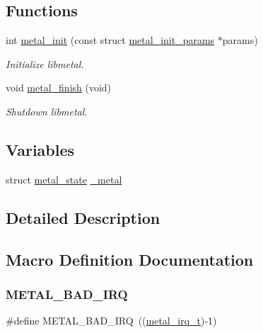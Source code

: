 \subsection*{Functions}
\begin{DoxyCompactItemize}
\item 
int \hyperlink{group__system_ga9a5f477e8ab7ed4bcc57e6d01a4ad3c7}{metal\+\_\+init} (const struct \hyperlink{structmetal__init__params}{metal\+\_\+init\+\_\+params} $\ast$params)
\begin{DoxyCompactList}\small\item\em Initialize libmetal. \end{DoxyCompactList}\item 
void \hyperlink{group__system_ga5760e3af70ec9a782c53e8ad9193d66b}{metal\+\_\+finish} (void)
\begin{DoxyCompactList}\small\item\em Shutdown libmetal. \end{DoxyCompactList}\end{DoxyCompactItemize}
\subsection*{Variables}
\begin{DoxyCompactItemize}
\item 
struct \hyperlink{structmetal__state}{metal\+\_\+state} \hyperlink{group__system_ga929f8594b076a54b9773b4ab8ca2327d}{\+\_\+metal}
\end{DoxyCompactItemize}


\subsection{Detailed Description}


\subsection{Macro Definition Documentation}
\mbox{\label{group__system_ga7b9c79fbe0ae59c5c0c1092af01764d1}} 
\subsubsection{\texorpdfstring{M\+E\+T\+A\+L\+\_\+\+B\+A\+D\+\_\+\+I\+RQ}{METAL\_BAD\_IRQ}}
{\footnotesize\ttfamily \#define M\+E\+T\+A\+L\+\_\+\+B\+A\+D\+\_\+\+I\+RQ~((\hyperlink{group__system_ga5b3ecd7ba1914b26547392ceadec813c}{metal\+\_\+irq\+\_\+t})-\/1)}

